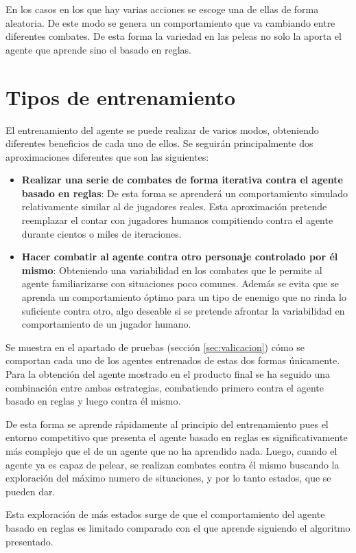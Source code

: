 En los casos en los que hay varias acciones se escoge una de ellas de forma aleatoria. De este modo se genera un comportamiento que va cambiando entre diferentes combates. De esta forma la variedad en las peleas no solo la aporta el agente que aprende sino el basado en reglas.

\section{Tipos de entrenamiento}


El entrenamiento del agente se puede realizar de varios modos, obteniendo diferentes beneficios de cada uno de ellos. Se seguirán principalmente dos aproximaciones diferentes que son las siguientes:

\begin{itemize}
	\item \textbf{Realizar una serie de combates de forma iterativa contra el agente basado en reglas}: De esta forma se aprenderá un comportamiento simulado relativamente similar al de jugadores reales. Esta aproximación pretende reemplazar el contar con jugadores humanos compitiendo contra el agente durante cientos o miles de iteraciones.
	\item \textbf{Hacer combatir al agente contra otro personaje controlado por él mismo}: Obteniendo una variabilidad en los combates que le permite al agente familiarizarse con situaciones poco comunes. Además se evita que se aprenda un comportamiento óptimo para un tipo de enemigo que no rinda lo suficiente contra otro, algo deseable si se pretende afrontar la variabilidad en comportamiento de un jugador humano. 
\end{itemize}

Se muestra en el apartado de pruebas (sección \ref{sec:valicacion}) cómo se comportan cada uno de los agentes entrenados de estas dos formas únicamente. Para la obtención del agente mostrado en el producto final se ha seguido una combinación entre ambas estrategias, combatiendo primero contra el agente basado en reglas y luego contra él mismo.

\bigskip

De esta forma se aprende rápidamente al principio del entrenamiento pues el entorno competitivo que presenta el agente basado en reglas es significativamente más complejo que el de un agente que no ha aprendido nada. Luego, cuando el agente ya es capaz de pelear, se realizan combates contra él mismo buscando la exploración del máximo numero de situaciones, y por lo tanto estados, que se pueden dar.

\bigskip

Esta exploración de más estados surge de que el comportamiento del agente basado en reglas es limitado comparado con el que aprende siguiendo el algoritmo presentado.


